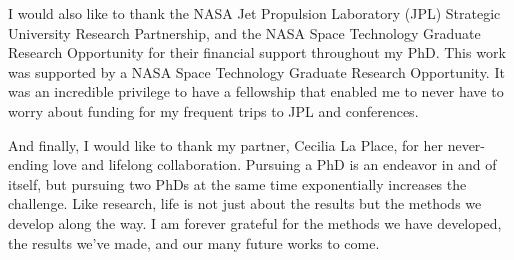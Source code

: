 I would also like to thank the NASA Jet Propulsion Laboratory (JPL) Strategic University Research Partnership, and the NASA Space Technology Graduate Research Opportunity for their financial support throughout my PhD. 
This work was supported by a NASA Space Technology Graduate Research Opportunity. 
It was an incredible privilege to have a fellowship that enabled me to never have to worry about funding for my frequent trips to JPL and conferences.

And finally, I would like to thank my partner, Cecilia La Place, for her never-ending love and lifelong collaboration. 
Pursuing a PhD is an endeavor in and of itself, but pursuing two PhDs at the same time exponentially increases the challenge.
Like research, life is not just about the results but the methods we develop along the way.
I am forever grateful for the methods we have developed, the results we've made, and our many future works to come.